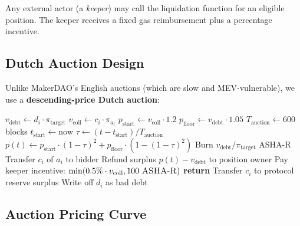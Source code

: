 \documentclass[11pt,a4paper]{article}
\newcommand{\ashares}{\textsc{ASHA-R}\xspace}
\begin{document}
Any external actor (a \emph{keeper}) may call the liquidation function for an eligible position.
The keeper receives a fixed gas reimbursement plus a percentage incentive.

\subsection{Dutch Auction Design}

Unlike MakerDAO's English auctions (which are slow and MEV-vulnerable), we use a \textbf{descending-price Dutch auction}:

\begin{algorithm}[H]
\caption{Dutch Auction Liquidation}
\label{alg:dutch}
\begin{algorithmic}[1]
  \State $v_{\text{debt}} \gets d_i \cdot \pi_{\text{target}}$ 
  \State $v_{\text{coll}} \gets c_i \cdot \pi_{a_i}$ 
  \State $p_{\text{start}} \gets v_{\text{coll}} \cdot 1.2$ 
  \State $p_{\text{floor}} \gets v_{\text{debt}} \cdot 1.05$ 
  \State $T_{\text{auction}} \gets 600$ blocks 
  \State $t_{\text{start}} \gets \text{now}$
  \State
    \State $\tau \gets (t - t_{\text{start}}) / T_{\text{auction}}$ 
    \State $p(t) \gets p_{\text{start}} \cdot (1 - \tau)^2 + p_{\text{floor}} \cdot (1 - (1 - \tau)^2)$
    \State {}
    \If{bidder submits $p(t)$ \ashares}
      \State Burn $v_{\text{debt}} / \pi_{\text{target}}$ \ashares {}
      \State Transfer $c_i$ of $a_i$ to bidder
      \State Refund surplus $p(t) - v_{\text{debt}}$ to position owner
      \State Pay keeper incentive: $\min(0.5\% \cdot v_{\text{coll}}, 100\text{ \ashares})$
      \State \textbf{return}
    \EndIf
  \EndWhile
  \State
  \State Transfer $c_i$ to protocol reserve surplus
  \State Write off $d_i$ as bad debt
\EndProcedure
\end{algorithmic}
\end{algorithm}

\subsection{Auction Pricing Curve}
\end{document}
